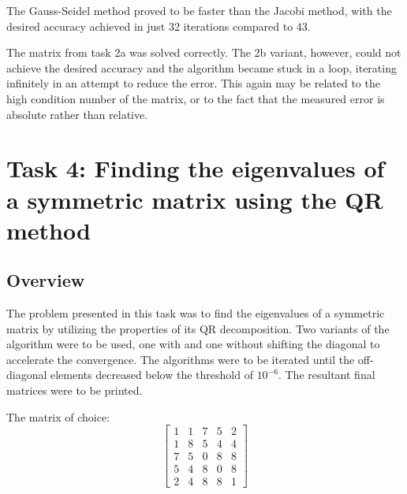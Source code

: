 \documentclass{article}
\begin{document}
	The Gauss-Seidel method proved to be faster than the Jacobi method, with the
	desired accuracy achieved in just 32 iterations compared to 43.
	
	The matrix from task 2a was solved correctly. The 2b variant, however, could
	not achieve the desired accuracy and the algorithm became stuck in a
	loop, iterating infinitely in an attempt to reduce the error. This again
	may be related to the high condition number of the matrix, or to the fact
	that the measured error is absolute rather than relative.
	
	\section{Task 4: Finding the eigenvalues of a symmetric matrix using the QR
	method}
	
	\subsection{Overview}
	
	The problem presented in this task was to find the eigenvalues of a
	symmetric matrix by utilizing the properties of its QR decomposition. Two
	variants of the algorithm were to be used, one with and one without shifting
	the diagonal to accelerate the convergence. The algorithms were to be
	iterated until the off-diagonal elements decreased below the threshold of
	$10^{-6}$. The resultant final matrices were to be printed.
	
	The matrix of choice:
	\begin{equation*}
		\begin{bmatrix}
			1 & 1 & 7 & 5 & 2\\
			1 & 8 & 5 & 4 & 4\\
			7 & 5 & 0 & 8 & 8\\
			5 & 4 & 8 & 0 & 8\\
			2 & 4 & 8 & 8 & 1
		\end{bmatrix}
	\end{equation*}
	
\end{document}
